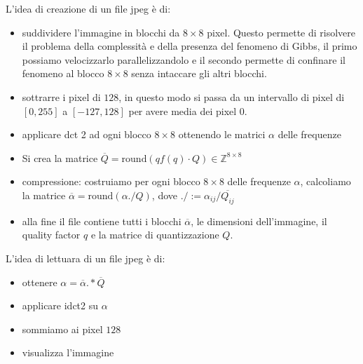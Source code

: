 L'idea di creazione di un file jpeg è di:
\begin{itemize}
    \item suddividere l'immagine in blocchi da $8\times 8$ pixel. Questo permette 
    di risolvere il problema della complessità e della presenza del fenomeno di 
    Gibbs, il primo 
    possiamo velocizzarlo parallelizzandolo e il secondo permette di confinare 
    il fenomeno al blocco $8\times 8$ senza intaccare gli altri blocchi. 
    \item sottrarre i pixel di $128$, in questo modo si passa da un intervallo di 
    pixel di $[0, 255]$ a $[-127,128]$ per avere media dei pixel $0$.
    \item applicare dct 2 ad ogni blocco $8\times 8$ ottenendo le matrici $\alpha$ delle frequenze
    \item Si crea la matrice $\overline{Q} = \text{round} (qf(q)\cdot Q)\in \mathbb{Z}^{8\times 8}$
    \item compressione: costruiamo per ogni blocco $8\times 8$ delle frequenze 
    $\alpha$, calcoliamo la matrice $\overline{\alpha} = \text{round}(\alpha./Q)$,
    dove $./:= \alpha_{ij} / \overline{Q_{ij}}$ 
    \item alla fine il file contiene tutti i blocchi $\overline{\alpha}$, le dimensioni 
    dell'immagine, il quality factor $q$ e la matrice di quantizzazione $Q$.  
\end{itemize}

L'idea di lettuara di un file jpeg è di:
\begin{itemize}
    \item ottenere $\alpha = \overline{\alpha}.*\overline{Q}$
    \item applicare idct2 su $\alpha$
    \item sommiamo ai pixel $128$
    \item visualizza l'immagine
\end{itemize}